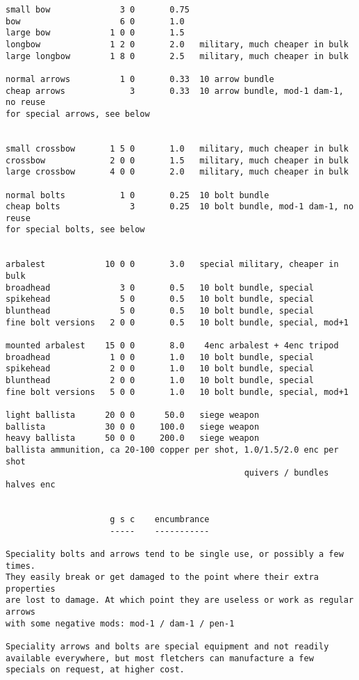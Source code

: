 \begin{verbatim}
small bow              3 0       0.75
bow                    6 0       1.0
large bow            1 0 0       1.5
longbow              1 2 0       2.0   military, much cheaper in bulk
large longbow        1 8 0       2.5   military, much cheaper in bulk

normal arrows          1 0       0.33  10 arrow bundle
cheap arrows             3       0.33  10 arrow bundle, mod-1 dam-1, no reuse
for special arrows, see below


small crossbow       1 5 0       1.0   military, much cheaper in bulk
crossbow             2 0 0       1.5   military, much cheaper in bulk
large crossbow       4 0 0       2.0   military, much cheaper in bulk

normal bolts           1 0       0.25  10 bolt bundle
cheap bolts              3       0.25  10 bolt bundle, mod-1 dam-1, no reuse
for special bolts, see below


arbalest            10 0 0       3.0   special military, cheaper in bulk
broadhead              3 0       0.5   10 bolt bundle, special
spikehead              5 0       0.5   10 bolt bundle, special
blunthead              5 0       0.5   10 bolt bundle, special
fine bolt versions   2 0 0       0.5   10 bolt bundle, special, mod+1

mounted arbalest    15 0 0       8.0    4enc arbalest + 4enc tripod
broadhead            1 0 0       1.0   10 bolt bundle, special
spikehead            2 0 0       1.0   10 bolt bundle, special
blunthead            2 0 0       1.0   10 bolt bundle, special
fine bolt versions   5 0 0       1.0   10 bolt bundle, special, mod+1

light ballista      20 0 0      50.0   siege weapon
ballista            30 0 0     100.0   siege weapon
heavy ballista      50 0 0     200.0   siege weapon
ballista ammunition, ca 20-100 copper per shot, 1.0/1.5/2.0 enc per shot
                                                quivers / bundles halves enc


                     g s c    encumbrance
                     -----    -----------

Speciality bolts and arrows tend to be single use, or possibly a few times.
They easily break or get damaged to the point where their extra properties
are lost to damage. At which point they are useless or work as regular arrows
with some negative mods: mod-1 / dam-1 / pen-1

Speciality arrows and bolts are special equipment and not readily available everywhere, but most fletchers can manufacture a few specials on request, at higher cost.


\end{verbatim}
